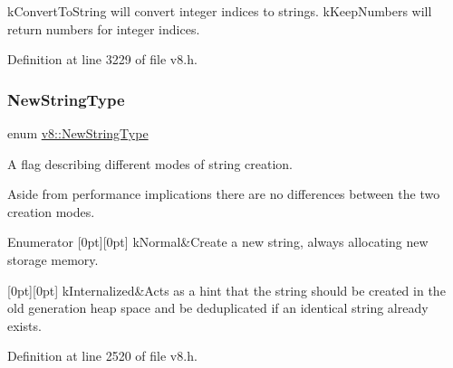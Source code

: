 k\+Convert\+To\+String will convert integer indices to strings. k\+Keep\+Numbers will return numbers for integer indices. 

Definition at line 3229 of file v8.\+h.

\mbox{\label{namespacev8_ac9163ab12fb3b2a95907a3a0367c6095}} 
\subsubsection{\texorpdfstring{New\+String\+Type}{NewStringType}}
{\footnotesize\ttfamily enum \mbox{\hyperlink{namespacev8_ac9163ab12fb3b2a95907a3a0367c6095}{v8\+::\+New\+String\+Type}}\hspace{0.3cm}{\ttfamily [strong]}}

A flag describing different modes of string creation.

Aside from performance implications there are no differences between the two creation modes. \begin{DoxyEnumFields}{Enumerator}
[0pt][0pt]{}\mbox{\label{namespacev8_ac9163ab12fb3b2a95907a3a0367c6095a07fa7a19aa722c635a15e94cb7f50416}} 
k\+Normal&Create a new string, always allocating new storage memory. \\
\hline

[0pt][0pt]{}\mbox{\label{namespacev8_ac9163ab12fb3b2a95907a3a0367c6095ade6a7f11cd845d59e52b388d18929295}} 
k\+Internalized&Acts as a hint that the string should be created in the old generation heap space and be deduplicated if an identical string already exists. \\
\hline

\end{DoxyEnumFields}


Definition at line 2520 of file v8.\+h.

\mbox{\label{namespacev8_a05f25f935e108a1ea2d150e274602b87}} 
